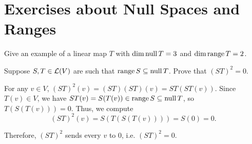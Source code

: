 \section*{Exercises about Null Spaces and Ranges}

\begin{xrcs}
  Give an example of a linear map $T$ with $\dim \operatorname{null} T = 3$ and $\dim \operatorname{range} T = 2$.
\end{xrcs}

\begin{xrcs}
  Suppose $S, T \in \mathcal{L}(V)$ are such that $\operatorname{range} S \subseteq \operatorname{null} T$. Prove that $(ST)^2 = 0$.

  \begin{xprf}
    For any $v \in V$, $(ST)^2 (v) = (ST)(ST) (v) = ST (ST(v))$. Since $T(v) \in V$, we have $ST(v) = S(T(v)) \in \operatorname{range} S \subseteq \operatorname{null} T$, so $T(S(T(v)))=0$. Thus, we compute
    \begin{equation}
      (ST)^2 (v) = S(T(S(T(v)))) = S(0) = 0.
    \end{equation}

    Therefore, $(ST)^2$ sends every $v$ to $0$, i.e. $(ST)^2 = 0$.
  \end{xprf}
\end{xrcs}


